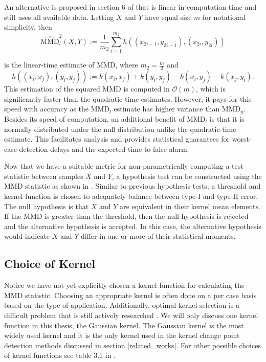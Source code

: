 An alternative is proposed in section 6 of \cite{gretton2012kernel} that is linear in computation time and still uses all available data. Letting $X$ and $Y$ have equal size $m$ for notational simplicity, then
\begin{equation}
\label{mmd_linear}
\widehat{\text{MMD}}_{l}^{2}(X, Y) :=\frac{1}{m_{2}} \sum_{i=1}^{m_{2}} h\left(\left(x_{2 i-1}, y_{2 i-1}\right),\left(x_{2 i}, y_{2 i}\right)\right)
\end{equation}

is the linear-time estimate of MMD, where $m_2=\frac{m}{2}$ and
\begin{equation}
h\left((x_i, x_j), (y_i, y_j)\right):=k\left(x_{i}, x_{j}\right)+k\left(y_{i}, y_{j}\right)-k\left(x_{i}, y_{j}\right)-k\left(x_{j}, y_{i}\right).
\end{equation}
This estimation of the squared MMD is computed in $\mathcal{O}(m)$, which is significantly faster than the quadratic-time estimates. However, it pays for this speed with accuracy as the MMD$_l$ estimate has higher variance than MMD$_u$. Besides its speed of computation, an additional benefit of MMD$_l$ is that it is normally distributed under the null distribution unlike the quadratic-time estimate. This facilitates analysis and provides statistical guarantees for worst-case detection delays and the expected time to false alarm. 

Now that we have a suitable metric for non-parametrically computing a test statistic between samples $X$ and $Y$, a hypothesis test can be constructed using the MMD statistic as shown in \cite{gretton2012kernel}. Similar to previous hypothesis tests, a threshold and kernel function is chosen to adequately balance between type-I and type-II error. The null hypothesis is that $X$ and $Y$ are equivalent in their kernel mean elements.  If the MMD is greater than the threshold, then the null hypothesis is rejected and the alternative hypothesis is accepted. In this case, the alternative hypothesis would indicate $X$ and $Y$ differ in one  or more of their statistical moments.

\subsection{Choice of Kernel}
Notice we have not yet explicitly chosen a kernel function for calculating the MMD statistic. Choosing an appropriate kernel is often done on a per case basis based on the type of application. Additionally, optimal kernel selection is a difficult problem that is still actively researched \cite{fukumizu2009kernel} \cite{gretton2012optimal}. We will only discuss one kernel function in this thesis, the Gaussian kernel. The Gaussian kernel is the most widely used kernel and it is the only kernel used in the kernel change point detection methods discussed in section \ref{related_works}.  For other possible choices of kernel functions see table 3.1 in \cite{muandet2017kernel}.

